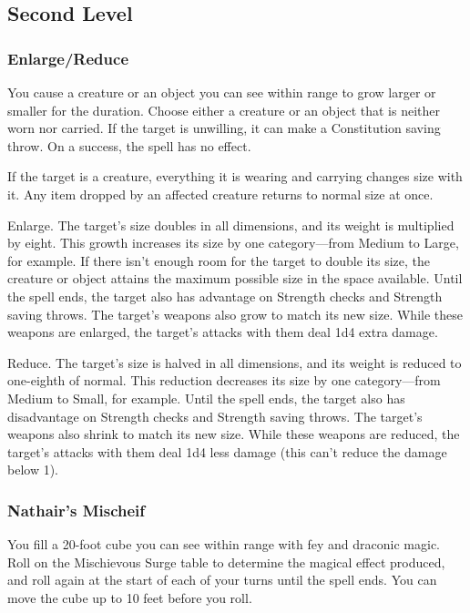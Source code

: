 \documentclass[11pt]{article}
\begin{document}
\subsection{Second Level}
\label{sec:orgc0c2352}
\subsubsection{Enlarge/Reduce}
\label{sec:orga94d6d6}
You cause a creature or an object you can see within range to grow larger or smaller for the duration. Choose either a creature or an object that is neither worn nor carried. If the target is unwilling, it can make a Constitution saving throw. On a success, the spell has no effect.

If the target is a creature, everything it is wearing and carrying changes size with it. Any item dropped by an affected creature returns to normal size at once.

Enlarge. The target's size doubles in all dimensions, and its weight is multiplied by eight. This growth increases its size by one category—from Medium to Large, for example. If there isn't enough room for the target to double its size, the creature or object attains the maximum possible size in the space available. Until the spell ends, the target also has advantage on Strength checks and Strength saving throws. The target's weapons also grow to match its new size. While these weapons are enlarged, the target's attacks with them deal 1d4 extra damage.

Reduce. The target's size is halved in all dimensions, and its weight is reduced to one-eighth of normal. This reduction decreases its size by one category—from Medium to Small, for example. Until the spell ends, the target also has disadvantage on Strength checks and Strength saving throws. The target's weapons also shrink to match its new size. While these weapons are reduced, the target's attacks with them deal 1d4 less damage (this can't reduce the damage below 1).
\subsubsection{Nathair's Mischeif}
\label{sec:org817f3ef}

You fill a 20-foot cube you can see within range with fey and draconic magic. Roll on the Mischievous Surge table to determine the magical effect produced, and roll again at the start of each of your turns until the spell ends. You can move the cube up to 10 feet before you roll.
\end{document}
